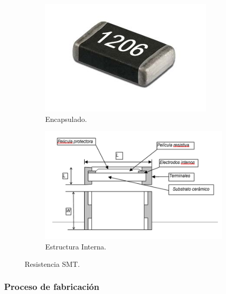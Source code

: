 \begin{figure}[H]
    \centering
    \begin{subfigure}[c]{0.45 \textwidth}
        \includegraphics[width=\textwidth]{Imagenes/Resistencias SMT - Encapsulado.png}
        \caption{Encapsulado.}
    \end{subfigure}
    \hfill
    \begin{subfigure}[c]{0.45 \textwidth}
        \includegraphics[width=\textwidth]{Imagenes/Resistencias SMT - Estructura Interna.png}
        \caption{Estructura Interna.}
    \end{subfigure}
    \caption{Resistencia SMT.}
\end{figure}

\subsubsection{Proceso de fabricación}

